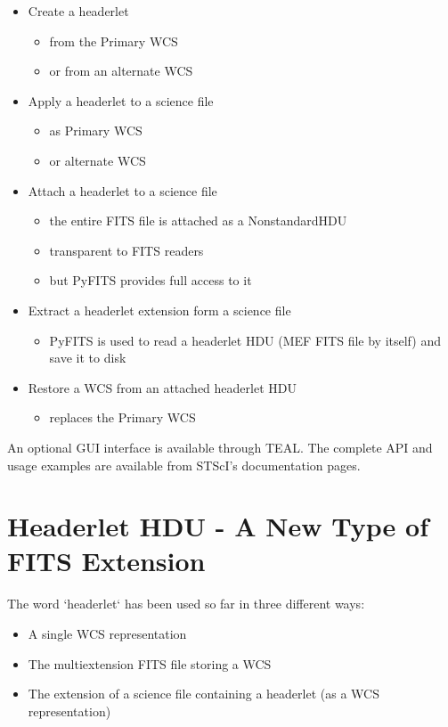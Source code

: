 \begin{itemize}
\item Create a headerlet
\begin{itemize}
  \item from the Primary WCS
  \item or from an alternate WCS
\end{itemize}
\item Apply a headerlet to a science file
\begin{itemize}
  \item as Primary WCS
  \item or alternate WCS
\end{itemize}
\item Attach a headerlet to a science file
\begin{itemize}
  \item the entire FITS file is attached as a NonstandardHDU
  \item transparent to FITS readers
  \item but PyFITS provides full access to it
\end{itemize}
\item Extract a headerlet extension form a science file
\begin{itemize}
  \item PyFITS is used to read a headerlet HDU (MEF FITS file by itself) and save it to disk
\end{itemize}
\item Restore a WCS from an attached headerlet HDU
\begin{itemize}
  \item replaces the Primary WCS
\end{itemize}
\end{itemize}

An optional GUI interface is available through TEAL. The complete API and usage examples are available from STScI's documentation pages.

\section{Headerlet HDU - A New Type of FITS Extension}
The word `headerlet` has been used so far in three different ways:

\begin{itemize}
\item A single WCS representation
\item The multiextension FITS file storing a WCS
\item The extension of a science file containing a headerlet (as a WCS representation)
\end{itemize}

